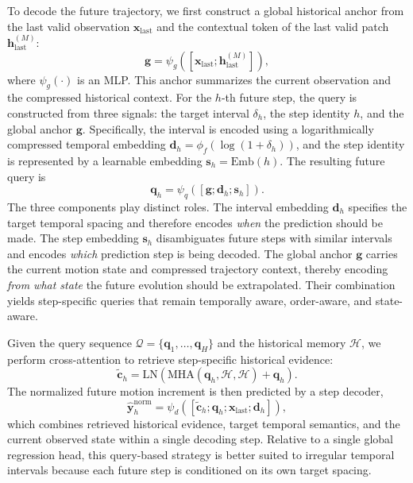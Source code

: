 To decode the future trajectory, we first construct a global historical anchor from the last valid observation $\bm{x}_{\mathrm{last}}$ and the contextual token of the last valid patch $\bm{h}_{\mathrm{last}}^{(M)}$:
\begin{equation}
\bm{g} = \psi_g([\bm{x}_{\mathrm{last}};\bm{h}_{\mathrm{last}}^{(M)}]),
\end{equation}
where $\psi_g(\cdot)$ is an MLP. This anchor summarizes the current observation and the compressed historical context. For the $h$-th future step, the query is constructed from three signals: the target interval $\delta_h$, the step identity $h$, and the global anchor $\bm{g}$. Specifically, the interval is encoded using a logarithmically compressed temporal embedding $\bm{d}_h=\phi_f(\log(1+\delta_h))$, and the step identity is represented by a learnable embedding $\bm{s}_h=\mathrm{Emb}(h)$. The resulting future query is
\begin{equation}
\bm{q}_h = \psi_q([\bm{g};\bm{d}_h;\bm{s}_h]).
\end{equation}
The three components play distinct roles. The interval embedding $\bm{d}_h$ specifies the target temporal spacing and therefore encodes \emph{when} the prediction should be made. The step embedding $\bm{s}_h$ disambiguates future steps with similar intervals and encodes \emph{which} prediction step is being decoded. The global anchor $\bm{g}$ carries the current motion state and compressed trajectory context, thereby encoding \emph{from what state} the future evolution should be extrapolated. Their combination yields step-specific queries that remain temporally aware, order-aware, and state-aware.

Given the query sequence $\mathcal{Q}=\{\bm{q}_1,\dots,\bm{q}_H\}$ and the historical memory $\mathcal{H}$, we perform cross-attention to retrieve step-specific historical evidence:
\begin{equation}
\tilde{\bm{c}}_h = \mathrm{LN}\!\left(\mathrm{MHA}(\bm{q}_h,\mathcal{H},\mathcal{H}) + \bm{q}_h\right).
\end{equation}
The normalized future motion increment is then predicted by a step decoder,
\begin{equation}
\hat{\bm{y}}_h^{\mathrm{norm}} = \psi_d([\tilde{\bm{c}}_h;\bm{q}_h;\bm{x}_{\mathrm{last}};\bm{d}_h]),
\end{equation}
which combines retrieved historical evidence, target temporal semantics, and the current observed state within a single decoding step. Relative to a single global regression head, this query-based strategy is better suited to irregular temporal intervals because each future step is conditioned on its own target spacing.

